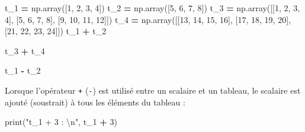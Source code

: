 \documentclass[12pt,]{book}
\newenvironment{Shaded}{\begin{snugshade}}{\end{snugshade}}
\newcommand{\DecValTok}[1]{\textcolor[rgb]{0.00,0.00,0.81}{#1}}
\newcommand{\CharTok}[1]{\textcolor[rgb]{0.31,0.60,0.02}{#1}}
\newcommand{\StringTok}[1]{\textcolor[rgb]{0.31,0.60,0.02}{#1}}
\newcommand{\OperatorTok}[1]{\textcolor[rgb]{0.81,0.36,0.00}{\textbf{#1}}}
\newcommand{\BuiltInTok}[1]{#1}
\newcommand{\NormalTok}[1]{#1}
\numberwithin{equation}{section}
\numberwithin{countremarque}{section}
\begin{document}
\begin{Shaded}
\begin{Highlighting}[]
\NormalTok{t_1 }\OperatorTok{=}\NormalTok{ np.array([}\DecValTok{1}\NormalTok{, }\DecValTok{2}\NormalTok{, }\DecValTok{3}\NormalTok{, }\DecValTok{4}\NormalTok{])}
\NormalTok{t_2 }\OperatorTok{=}\NormalTok{ np.array([}\DecValTok{5}\NormalTok{, }\DecValTok{6}\NormalTok{, }\DecValTok{7}\NormalTok{, }\DecValTok{8}\NormalTok{])}
\NormalTok{t_3 }\OperatorTok{=}\NormalTok{ np.array([[}\DecValTok{1}\NormalTok{, }\DecValTok{2}\NormalTok{, }\DecValTok{3}\NormalTok{, }\DecValTok{4}\NormalTok{], [}\DecValTok{5}\NormalTok{, }\DecValTok{6}\NormalTok{, }\DecValTok{7}\NormalTok{, }\DecValTok{8}\NormalTok{], [}\DecValTok{9}\NormalTok{, }\DecValTok{10}\NormalTok{, }\DecValTok{11}\NormalTok{, }\DecValTok{12}\NormalTok{]])}
\NormalTok{t_4 }\OperatorTok{=}\NormalTok{ np.array([[}\DecValTok{13}\NormalTok{, }\DecValTok{14}\NormalTok{, }\DecValTok{15}\NormalTok{, }\DecValTok{16}\NormalTok{], [}\DecValTok{17}\NormalTok{, }\DecValTok{18}\NormalTok{, }\DecValTok{19}\NormalTok{, }\DecValTok{20}\NormalTok{], [}\DecValTok{21}\NormalTok{, }\DecValTok{22}\NormalTok{, }\DecValTok{23}\NormalTok{, }\DecValTok{24}\NormalTok{]])}
\NormalTok{t_1 }\OperatorTok{+}\NormalTok{ t_2}
\end{Highlighting}
\end{Shaded}

\begin{Shaded}
\begin{Highlighting}[]
\NormalTok{t_3 }\OperatorTok{+}\NormalTok{ t_4}
\end{Highlighting}
\end{Shaded}

\begin{Shaded}
\begin{Highlighting}[]
\NormalTok{t_1 }\OperatorTok{-}\NormalTok{ t_2}
\end{Highlighting}
\end{Shaded}

Lorsque l'opérateur \texttt{+} (\texttt{-}) est utilisé entre un
scalaire et un tableau, le scalaire est ajouté (soustrait) à tous les
éléments du tableau :

\begin{Shaded}
\begin{Highlighting}[]
\BuiltInTok{print}\NormalTok{(}\StringTok{"t_1 + 3 : }\CharTok{\textbackslash{}n}\StringTok{"}\NormalTok{, t_1 }\OperatorTok{+} \DecValTok{3}\NormalTok{)}
\end{Highlighting}
\end{Shaded}
\end{document}
